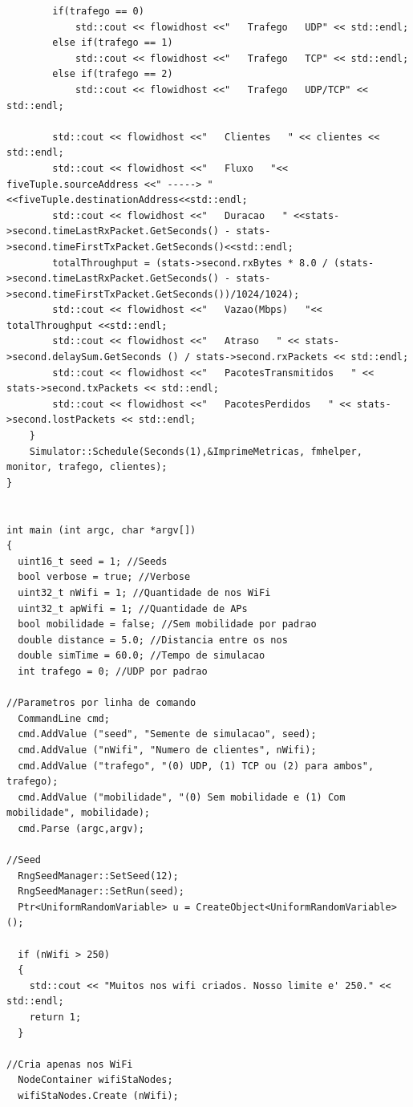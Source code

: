 \documentclass[12pt]{article}
\begin{document}
\begin{lstlisting}
		if(trafego == 0)
			std::cout << flowidhost <<"   Trafego   UDP" << std::endl;
		else if(trafego == 1)
			std::cout << flowidhost <<"   Trafego   TCP" << std::endl;
		else if(trafego == 2)
			std::cout << flowidhost <<"   Trafego   UDP/TCP" << std::endl;

		std::cout << flowidhost <<"   Clientes   " << clientes << std::endl; 
		std::cout << flowidhost <<"   Fluxo   "<< fiveTuple.sourceAddress <<" -----> "<<fiveTuple.destinationAddress<<std::endl;
		std::cout << flowidhost <<"   Duracao   " <<stats->second.timeLastRxPacket.GetSeconds() - stats->second.timeFirstTxPacket.GetSeconds()<<std::endl;
		totalThroughput = (stats->second.rxBytes * 8.0 / (stats->second.timeLastRxPacket.GetSeconds() - stats->second.timeFirstTxPacket.GetSeconds())/1024/1024);
		std::cout << flowidhost <<"   Vazao(Mbps)   "<< totalThroughput <<std::endl;
		std::cout << flowidhost <<"   Atraso   " << stats->second.delaySum.GetSeconds () / stats->second.rxPackets << std::endl;
		std::cout << flowidhost <<"   PacotesTransmitidos   " << stats->second.txPackets << std::endl;
		std::cout << flowidhost <<"   PacotesPerdidos   " << stats->second.lostPackets << std::endl;
	}
	Simulator::Schedule(Seconds(1),&ImprimeMetricas, fmhelper, monitor, trafego, clientes);
}


int main (int argc, char *argv[])
{
  uint16_t seed = 1; //Seeds
  bool verbose = true; //Verbose
  uint32_t nWifi = 1; //Quantidade de nos WiFi
  uint32_t apWifi = 1; //Quantidade de APs
  bool mobilidade = false; //Sem mobilidade por padrao
  double distance = 5.0; //Distancia entre os nos
  double simTime = 60.0; //Tempo de simulacao
  int trafego = 0; //UDP por padrao
  
//Parametros por linha de comando
  CommandLine cmd;
  cmd.AddValue ("seed", "Semente de simulacao", seed);
  cmd.AddValue ("nWifi", "Numero de clientes", nWifi);
  cmd.AddValue ("trafego", "(0) UDP, (1) TCP ou (2) para ambos", trafego);
  cmd.AddValue ("mobilidade", "(0) Sem mobilidade e (1) Com mobilidade", mobilidade);
  cmd.Parse (argc,argv);

//Seed
  RngSeedManager::SetSeed(12);
  RngSeedManager::SetRun(seed);
  Ptr<UniformRandomVariable> u = CreateObject<UniformRandomVariable> ();

  if (nWifi > 250)
  {
    std::cout << "Muitos nos wifi criados. Nosso limite e' 250." << std::endl;
    return 1;
  }

//Cria apenas nos WiFi
  NodeContainer wifiStaNodes;
  wifiStaNodes.Create (nWifi);


\end{lstlisting}
\end{document}
